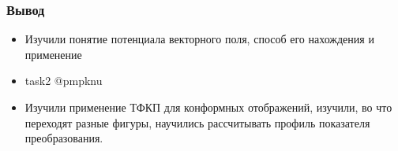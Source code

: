 \begin{frame}\frametitle{Вывод}
  \begin{itemize}
    \item Изучили понятие потенциала векторного поля,
      способ его нахождения и применение
    \item task2 @pmpknu
    \item Изучили применение ТФКП для конформных отображений,
      изучили, во что переходят разные фигуры,
      научились рассчитывать профиль показателя преобразования.
  \end{itemize}
\end{frame}
